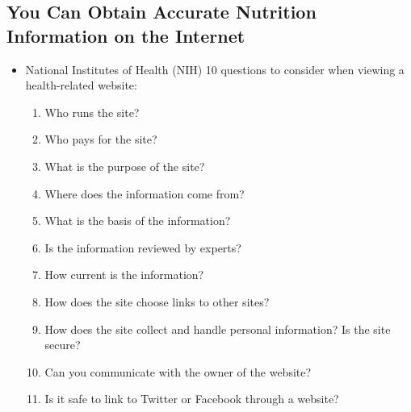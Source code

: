 \documentclass[12pt]{article}
\begin{document}
        \subsection{You Can Obtain Accurate Nutrition Information on the Internet}
            \begin{itemize}
                \item National Institutes of Health (NIH) 10 questions to consider when viewing a health-related website:
                    \begin{enumerate}
                        \item Who runs the site?
                        \item Who pays for the site?
                        \item What is the purpose of the site?
                        \item Where does the information come from?
                        \item What is the basis of the information?
                        \item Is the information reviewed by experts?
                        \item How current is the information?
                        \item How does the site choose links to other sites?
                        \item How does the site collect and handle personal information? Is the site secure?
                        \item Can you communicate with the owner of the website?
                        \item Is it safe to link to Twitter or Facebook through a website?
                    \end{enumerate}
            \end{itemize}
\end{document}
